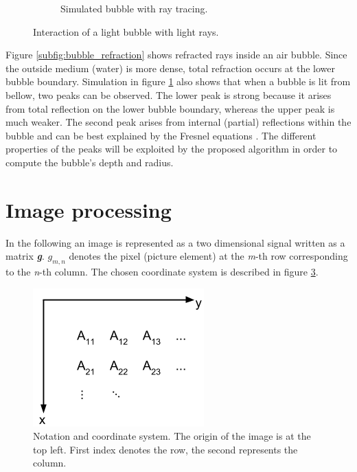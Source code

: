 \begin{figure}
\begin{subfigure}[t]{0.5\textwidth}
		        \caption{Simulated bubble with ray tracing.}	
		        \label{subfig:bubble_simulation}
		    \end{subfigure}
		    
		    \caption{Interaction of a light bubble with light rays.}
		    \label{fig:bubble_physics}
	 		\end{figure}	
			
			Figure \ref{subfig:bubble_refraction} shows refracted rays inside an air bubble. Since the outside medium (water) is more dense, total refraction occurs at the lower bubble boundary. Simulation in figure \ref{subfig:bubble_simulation} also shows that when a bubble is lit from bellow, two peaks can be observed. The lower peak is strong because it arises from total reflection on the lower bubble boundary, whereas the upper peak is much weaker. The second peak arises from internal (partial) reflections within the bubble and can be best explained by the Fresnel equations \citep{Demtroeder2}. 
			The different properties of the peaks will be exploited by the proposed algorithm in order to compute the bubble's depth and radius.
			
			
	
	\section{Image processing}	\label{image_processing}
	In the following an image is represented as a two dimensional signal written as a matrix \textit{\textbf{g}}. $g_{m,n}$ denotes the pixel (picture element) at the \textit{m}-th row corresponding to the \textit{n}-th column. The chosen coordinate system is described in figure \ref{fig:coord_sys}. 
	
		\begin{figure}
		    \centering
		    \includegraphics[scale=0.4]{images/coord_sys.png}
		    \caption{Notation and coordinate system. The origin of the image is at the top left. First index denotes the row, the second represents the column. }
		    \label{fig:coord_sys}
		\end{figure}
	
